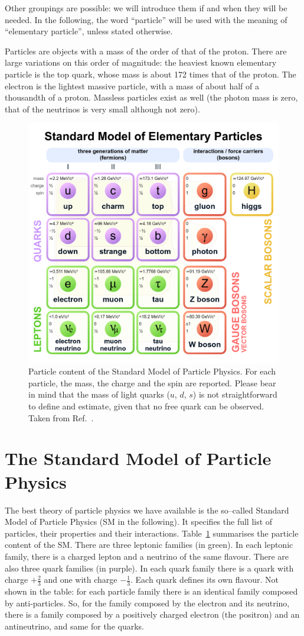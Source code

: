 Other groupings are possible: we will introduce them if and when they will be needed. In the following, the word ``particle'' will be used with the meaning of ``elementary particle'', unless stated otherwise.

Particles are objects with a mass of the order of that of the proton. There are large variations on this order of magnitude: the heaviest known elementary particle is the top quark, whose mass is about 172 times that of the proton. The electron is the lightest massive particle, with a mass of about half of a thousandth of a proton. Massless particles exist as well (the photon mass is zero, that of the neutrinos is very small although not zero).

\begin{figure}[tb] 
	\centering
	\includegraphics[width=0.5\columnwidth]{Figures/Standard_Model_of_Elementary_Particles.png}
	\caption{Particle content of the Standard Model of Particle Physics. For each particle, the mass, the charge and the spin are reported. Please bear in mind that the mass of light quarks ($u$, $d$, $s$) is not straightforward to define and estimate, given that no free quark can be observed. Taken from Ref.~\cite{SM_wikipedia}.}
		\label{tab:SM}	
\end{figure}


\section{The Standard Model of Particle Physics} 

The best theory of particle physics we have available is the so--called Standard Model of Particle Physics (SM in the following). It specifies the full list of particles, their properties and their interactions. Table~\ref{tab:SM} summarises the particle content of the SM. There are three leptonic families (in green). In each leptonic family, there is a charged lepton and a neutrino of the same flavour. There are also three quark families (in purple). In each quark family there is a quark with charge $+\frac{2}{3}$ and one with charge $-\frac{1}{3}$. Each quark defines its own flavour. Not shown in the table: for each particle family there is an identical family composed by anti-particles. So, for the family composed by the electron and its neutrino, there is a family composed by a positively charged electron (the positron) and an antineutrino, and same for the quarks. 


